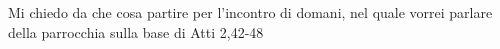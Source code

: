 \author{Daniele Gianotti}

Mi chiedo da che cosa partire per l’incontro di domani, nel quale vorrei parlare della parrocchia sulla base di Atti 2,42-48
